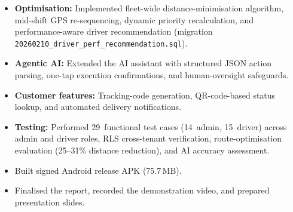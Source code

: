 \begin{itemize}
  \item \textbf{Optimisation:} Implemented fleet-wide distance-minimisation algorithm,
        mid-shift GPS re-sequencing, dynamic priority recalculation, and
        performance-aware driver recommendation (migration
        \texttt{20260210\_driver\_perf\_\allowbreak recommendation.sql}).
  \item \textbf{Agentic AI:} Extended the AI assistant with structured JSON action parsing,
        one-tap execution confirmations, and human-oversight safeguards.
  \item \textbf{Customer features:} Tracking-code generation, QR-code-based status lookup,
        and automated delivery notifications.
  \item \textbf{Testing:} Performed 29~functional test cases (14~admin, 15~driver) across admin and driver
        roles, RLS cross-tenant verification, route-optimisation evaluation
        (25--31\% distance reduction), and AI accuracy assessment.
  \item Built signed Android release APK (75.7\,MB).
  \item Finalised the report, recorded the demonstration video, and prepared
        presentation slides.
\end{itemize}

